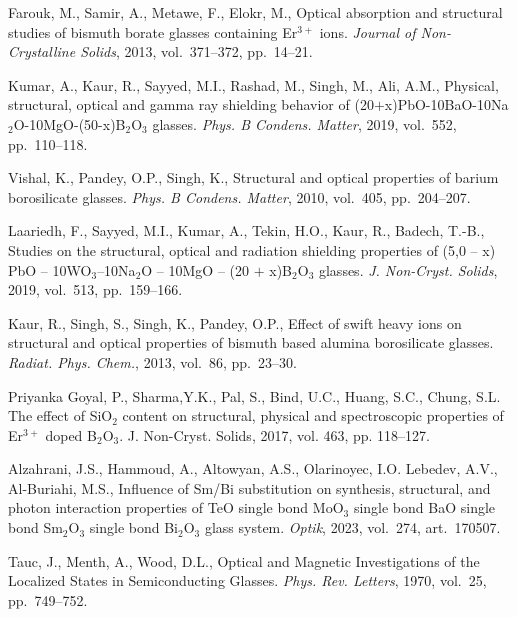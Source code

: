 \documentclass[press]{vestnik}
\begin{document}
\begin{thebibliography}{22}
Farouk, M., Samir, A., Metawe, F., Elokr, M., Optical absorption and 
structural studies of bismuth borate glasses containing Er$^{3+}$ ions. 
\emph{Journal of Non-Crystalline Solids}, 2013, vol.~371--372, pp.~14--21. 

Kumar, A., Kaur, R., Sayyed, M.I., Rashad, M., Singh, M., Ali, A.M., 
Physical, structural, optical and gamma ray shielding behavior of 
(20$+$x)PbO-10BaO-10Na$_{2}$O-10MgO-(50-x)B$_{2}$O$_{3}$ glasses. \emph{Phys. B 
Condens. Matter}, 2019, vol.~552, pp.~110--118. 

Vishal, K., Pandey, O.P., Singh, K., Structural and optical properties of 
barium borosilicate glasses. \emph{Phys. B Condens. Matter}, 2010, vol.~405, pp.~204--207. 

Laariedh, F., Sayyed, M.I., Kumar, A., Tekin, H.O., Kaur, R., Badech, 
T.-B., Studies on the structural, optical and radiation shielding properties 
of (5,0 -- x) PbO -- 10WO$_{3}$--10Na$_{2}$O -- 10MgO -- (20 $+$ 
x)B$_{2}$O$_{3}$ glasses. \emph{J. Non-Cryst. Solids}, 2019, vol.~513, pp.~159--166. 

Kaur, R., Singh, S., Singh, K., Pandey, O.P., Effect of swift heavy ions 
on structural and optical properties of bismuth based alumina borosilicate 
glasses. \emph{Radiat. Phys. Chem.}, 2013, vol.~86, pp.~23--30. 

Priyanka Goyal, P., Sharma,Y.K., Pal, S., Bind, U.C., Huang, S.C., 
Chung, S.L. The effect of SiO$_{2}$ content on structural, physical and 
spectroscopic properties of Er$^{3+}$ doped B$_{2}$O$_{3}$. J. Non-Cryst. 
Solids, 2017, vol. 463, pp. 118--127. 

Alzahrani, J.S., Hammoud, A., Altowyan, A.S., Olarinoyec, I.O. Lebedev, 
A.V., Al-Buriahi, M.S., Influence of Sm/Bi substitution on synthesis, 
structural, and photon interaction properties of TeO single bond MoO$_{3}$ 
single bond BaO single bond Sm$_{2}$O$_{3}$ single bond Bi$_{2}$O$_{3}$ 
glass system. \emph{Optik}, 2023, vol.~274, art.~170507. 

Tauc, J., Menth, A., Wood, D.L., Optical and Magnetic Investigations 
of the Localized States in Semiconducting Glasses. \emph{Phys. Rev. Letters}, 
1970, vol.~25, pp.~749--752. 


\end{thebibliography}
\end{document}
